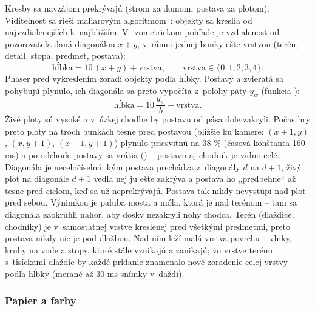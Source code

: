 \documentclass[11pt, a4paper]{article}
\begin{document}
Kresby sa navzájom prekrývajú (strom za domom, postava za plotom). Viditeľnosť sa rieši
maliarovým algoritmom~\cite[kap.~7]{Sobota2024}: objekty sa kreslia od najvzdialenejších
k~najbližším. V~izometrickom pohľade je vzdialenosť od pozorovateľa daná diagonálou $x + y$,
v~rámci jednej bunky ešte vrstvou (terén, detail, stopa, predmet, postava):
\begin{equation}
  \text{hĺbka} = 10\,(x + y) + \text{vrstva}, \qquad \text{vrstva} \in \{0, 1, 2, 3, 4\}.
\end{equation}
Phaser pred vykreslením zoradí objekty podľa hĺbky. Postavy a zvieratá sa pohybujú plynulo,
ich diagonála sa preto vypočíta z~polohy päty $y_w$ (funkcia ):
\begin{equation}
  \text{hĺbka} = 10\,\frac{y_w}{b} + \text{vrstva}.
\end{equation}
Živé ploty sú vysoké a v~úzkej chodbe by postavu od pása dole zakryli. Počas hry preto ploty
na troch bunkách tesne pred postavou (bližšie ku kamere: $(x{+}1, y)$, $(x, y{+}1)$,
$(x{+}1, y{+}1)$) plynulo priesvitnú na 38 \% (časová konštanta 160 ms) a po odchode postavy
sa vrátia () – postavu aj chodník je vidno celé.
Diagonála je neceločíselná: kým postava prechádza z~diagonály $d$ na $d + 1$, živý plot na
diagonále $d + 1$ vedľa nej ju ešte zakrýva a postava ho „predbehne“ až tesne pred cieľom,
keď sa už neprekrývajú. Postava tak nikdy nevystúpi nad plot pred sebou. Výnimkou je paluba
mosta a móla, ktorá je nad terénom – tam sa diagonála zaokrúhli nahor, aby dosky nezakryli
nohy chodca. Terén (dlaždice, chodníky) je v~samostatnej vrstve kreslenej pred všetkými
predmetmi, preto postava nikdy nie je pod dlažbou. Nad ním leží malá vrstva povrchu – vlnky,
kruhy na vode a stopy, ktoré stále vznikajú a zanikajú; vo vrstve terénu s~tisíckami dlaždíc
by každé pridanie znamenalo nové zoradenie celej vrstvy podľa hĺbky (merané až 30 ms snímky
v~daždi).

\subsubsection{Papier a farby}
\end{document}
